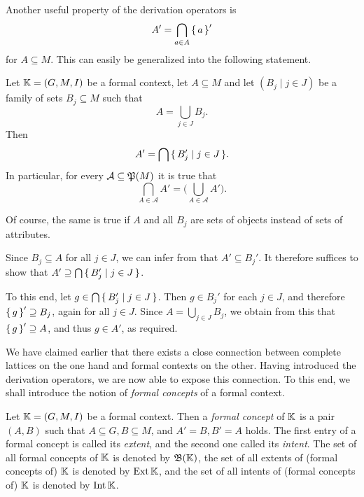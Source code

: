 Another useful property of the derivation operators is
\begin{equation*}
  A' = \bigcap_{a \in A} {\{\,a\,\}}'
\end{equation*}
for $A \subseteq M$.  This can easily be generalized into the following statement.

\begin{Lemma}
  \label{lem:piecewise-derivation}
  Let ${\mathbb{K}} = (G, M, I)$ be a formal context, let $A \subseteq M$ and let $(B_j \mid j
  \in J)$ be a family of sets $B_j \subseteq M$ such that
  \begin{equation*}
    A = \bigcup_{j \in J} B_j.
  \end{equation*}
  Then
  \begin{equation}
    \label{eq:2}
    A' = \bigcap {\ensuremath{\{\, B_j' \mid j \in J \,\}}}.
  \end{equation}
  In particular, for every $\mathcal{A} \subseteq {\ensuremath{\mathfrak{P}(M)}}$ it is true that
  \begin{equation}
    \label{eq:3}
    \bigcap_{A \in \mathcal{A}} A' = \bigl(\bigcup_{A \in \mathcal{A}} A'\bigr).
  \end{equation}
\end{Lemma}
%
Of course, the same is true if $A$ and all $B_j$ are sets of objects instead of sets of
attributes.
%
\begin{Proof}
  Since $B_j \subseteq A$ for all $j \in J$, we can infer from
   that $A' \subseteq B_j'$.  It therefore
  suffices to show that $A' \supseteq \bigcap {\ensuremath{\{\, B_j' \mid j \in J \,\}}}$.

  To this end, let $g \in \bigcap {\ensuremath{\{\, B_j' \mid j \in J \,\}}}$.  Then $g \in B_j'$ for each
  $j \in J$, and therefore ${\{\,g\,\}}' \supseteq B_j$, again for all $j \in J$.  Since $A =
  \bigcup_{j \in J} B_j$, we obtain from this that ${\{\,g\,\}}' \supseteq A$, and thus $g \in
  A'$, as required.
\end{Proof}

We have claimed earlier that there exists a close connection between complete lattices on
the one hand and formal contexts on the other.  Having introduced the derivation
operators, we are now able to expose this connection.  To this end, we shall introduce the
notion of \emph{formal concepts} of a formal context.

\begin{Definition}
  \label{def:formal-concept}
  Let ${\mathbb{K}} = (G, M, I)$ be a formal context.  Then a \emph{formal concept} of ${\mathbb{K}}$
  is a pair $(A, B)$ such that $A \subseteq G, B \subseteq M$, and $A' = B, B' = A$ holds.
  The first entry of a formal concept is called its \emph{extent}, and the second one
  called its \emph{intent}.  The set of all formal concepts of ${\mathbb{K}}$ is denoted by
  $\operatorname{{\mathfrak{B}}}({\mathbb{K}})$, the set of all extents of (formal concepts of) ${\mathbb{K}}$ is denoted by
  $\operatorname{Ext}{\mathbb{K}}$, and the set of all intents of (formal concepts of) ${\mathbb{K}}$ is denoted by
  $\operatorname{Int}{\mathbb{K}}$.
\end{Definition}

